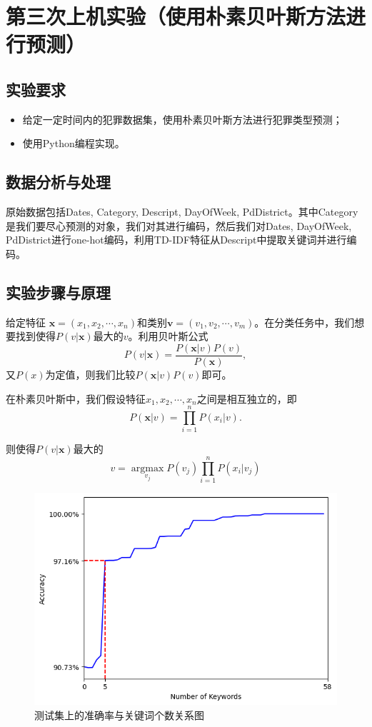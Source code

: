 \documentclass[a4paper,12pt]{report}
\begin{document}
\chapter{第三次上机实验（使用朴素贝叶斯方法进行预测）}
\section{实验要求}
\begin{itemize}
    \item 给定一定时间内的犯罪数据集，使用朴素贝叶斯方法进行犯罪类型预测；
    \item 使用Python编程实现。
\end{itemize}
\section{数据分析与处理}
\label{3.2}
\par 原始数据包括Dates, Category, Descript, DayOfWeek, PdDistrict。其中Category是我们要尽心预测的对象，我们对其进行编码，然后我们对Dates, DayOfWeek, PdDistrict进行one-hot编码，利用TD-IDF特征从Descript中提取关键词并进行编码。
\section{实验步骤与原理}
\par 给定特征 $\boldsymbol{x}=(x_{1},x_{2},\cdots,x_{n})$和类别$\boldsymbol{v}=(v_{1},v_{2},\cdots,v_{m})$。在分类任务中，我们想要找到使得$P(v|\boldsymbol{x})$最大的$v$。利用贝叶斯公式
$$P(v|\boldsymbol{x})=\frac{P(\boldsymbol{x}|v)P(v)}{P(\boldsymbol{x})},$$
又$P(x)$为定值，则我们比较$P(\boldsymbol{x}|v)P(v)$即可。
\par 在朴素贝叶斯中，我们假设特征$x_{1},x_{2},\cdots,x_{n}$之间是相互独立的，即
$$
P(\boldsymbol{x}|v)=\prod_{i=1}^{n}P(x_{i}|v).
$$
\par 则使得$P(v|\boldsymbol{x})$最大的
$$
v=\mathop{\arg\max}\limits_{v_{j}}P(v_{j})\prod_{i=1}^{n}P(x_{i}|v_{j})
$$
\begin{figure}[htbp]
    \centering
    \includegraphics[width=\textwidth]{../datasets/exp3/accuracy.png}
    \caption{测试集上的准确率与关键词个数关系图}
    \label{3.1}
    \hfill
\end{figure}
\end{document}
